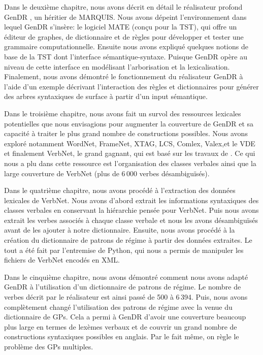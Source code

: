 Dans le deuxième chapitre, nous avons décrit en détail le réalisateur profond GenDR \citep{lareau18}, un héritier de MARQUIS. Nous avons dépeint l'environnement dans lequel GenDR s'insère: le logiciel MATE (conçu pour la TST), qui offre un éditeur de graphes, de dictionnaire et de règles pour développer et tester une grammaire computationnelle. Ensuite nous avons expliqué quelques notions de base de la \ac{TST} dont l'interface sémantique-syntaxe. Puisque GenDR opère au niveau de cette interface en modélisant l'arborisation et la lexicalisation. Finalement, nous avons démontré le fonctionnement du réalisateur GenDR à l'aide d'un exemple décrivant l'interaction des règles et dictionnaires pour générer des arbres syntaxiques de surface à partir d'un input sémantique.

Dans le troisième chapitre, nous avons fait un survol des ressources lexicales potentielles que nous envisagions pour augmenter la couverture de GenDR et sa capacité à traiter le plus grand nombre de constructions possibles. Nous avons exploré notamment WordNet, FrameNet, XTAG, LCS, Comlex, Valex,et le VDE et finalement VerbNet, le grand gagnant, qui est basé sur les travaux de \cite{verb-classes.levin.1993}. Ce qui nous a plu dans cette ressource est l'organisation des classes verbales ainsi que la large couverture de VerbNet (plus de 6\,000 verbes désambiguïsés).

Dans le quatrième chapitre, nous avons procédé à l'extraction des données lexicales de VerbNet. Nous avons d'abord extrait les informations syntaxiques des classes verbales en conservant la hiérarchie pensée pour VerbNet. Puis nous avons extrait les verbes associés à chaque classe verbale et nous les avons désambiguïsés avant de les ajouter à notre dictionnaire. Ensuite, nous avons procédé à la création du dictionnaire de patrons de régime à partir des données extraites. Le tout a été fait par l'entremise de Python, qui nous a permis de manipuler les fichiers de VerbNet encodés en XML.

Dans le cinquième chapitre, nous avons démontré comment nous avons adapté GenDR à l'utilisation d'un dictionnaire de patrons de régime. Le nombre de verbes décrit par le réalisateur est ainsi passé de 500 à 6\,394. Puis, nous avons complètement changé l'utilisation des patrons de régime avec la venue du dictionnaire de \acp{GP}. Cela a permi à GenDR d'avoir une couverture beaucoup plus large en termes de lexèmes verbaux et de couvrir un grand nombre de constructions syntaxiques possibles en anglais. Par le fait même, on règle le problème des \acp{GP} multiples.
	
